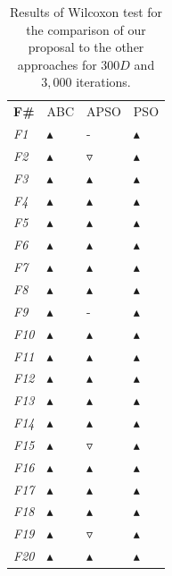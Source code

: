 \begin{table}[!h]
\caption{\small{Results of Wilcoxon test for the comparison of our proposal to the other approaches for $300D$ and $3,000$ iterations.}}
\label{tab:Wilcoxon_300D}
\begin{center}
\begin{tabular}{p{0.5cm}|p{1.5cm}|p{1.5cm}|p{1.5cm}}
\hline\noalign{\smallskip}
\textbf{F\#} & ABC & APSO & PSO    \\		
\noalign{\smallskip}
\hline
\noalign{\smallskip}
\textit{F1}	& $\blacktriangle$  & -  & $\blacktriangle$  \\
\textit{F2}	& $\blacktriangle$  & $\triangledown$  & $\blacktriangle$  \\
\textit{F3}	& $\blacktriangle$  & $\blacktriangle$  & $\blacktriangle$  \\
\textit{F4}&  $\blacktriangle$  & $\blacktriangle$  & $\blacktriangle$  \\
\textit{F5}&  $\blacktriangle$  & $\blacktriangle$  & $\blacktriangle$   \\
\textit{F6}&  $\blacktriangle$  & $\blacktriangle$  & $\blacktriangle$   \\
\textit{F7}&  $\blacktriangle$  & $\blacktriangle$  & $\blacktriangle$   \\
\textit{F8}&  $\blacktriangle$  & $\blacktriangle$  & $\blacktriangle$ \\
\textit{F9}&  $\blacktriangle$  & -  & $\blacktriangle$ \\
\textit{F10}& $\blacktriangle$  & $\blacktriangle$  & $\blacktriangle$ \\
\textit{F11}& $\blacktriangle$  & $\blacktriangle$  & $\blacktriangle$  \\
\textit{F12}& $\blacktriangle$  & $\blacktriangle$  & $\blacktriangle$ \\
\textit{F13}& $\blacktriangle$  & $\blacktriangle$  & $\blacktriangle$  \\
\textit{F14}& $\blacktriangle$  & $\blacktriangle$  & $\blacktriangle$   \\
\textit{F15}& $\blacktriangle$  & $\triangledown$  & $\blacktriangle$ \\
\textit{F16}& $\blacktriangle$  & $\blacktriangle$  & $\blacktriangle$  \\
\textit{F17}& $\blacktriangle$  & $\blacktriangle$  & $\blacktriangle$   \\
\textit{F18}& $\blacktriangle$  & $\blacktriangle$  & $\blacktriangle$  \\
\textit{F19}&  $\blacktriangle$  & $\triangledown$  & $\blacktriangle$  \\
\textit{F20}& $\blacktriangle$  & $\blacktriangle$  & $\blacktriangle$ \\
\hline
\end{tabular}
\end{center}
\end{table}

